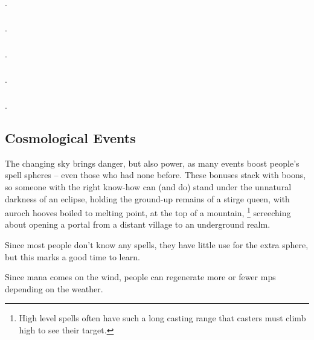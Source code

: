 \begin{multicols}{2}
\subsubsection{}
.

\subsubsection{}
.

\subsubsection{}
.

\subsubsection{}
.

\subsubsection{}
.

\setcounter{track}{\month}
\setcounter{age}{1}
\boxPair[t]{
  \parallelCalendar
}{
  \orrery[1/8, 1/23, 2/8, 2/23, 3/8, 3/23]
}

\setCycle{\month}{\day}

\subsection{Cosmological Events}
\label{weather}

The changing sky brings danger, but also power, as many events boost people's spell \glspl{sphere} -- even those who had none before.
These bonuses stack with \glspl{boon}, so someone with the right know-how can (and do) stand under the unnatural darkness of an eclipse, holding the ground-up remains of a stirge queen, with auroch hooves boiled to melting point, at the top of a mountain,%
\footnote{High level spells often have such a long casting range that casters must climb high to see their target.}
screeching about opening a portal from a distant \gls{village} to an underground realm.

Since most people don't know any spells, they have little use for the extra \gls{sphere}, but this marks a good time to learn.

Since mana comes on the wind, people can regenerate more or fewer \glspl{mp} depending on the weather.


\end{multicols}
